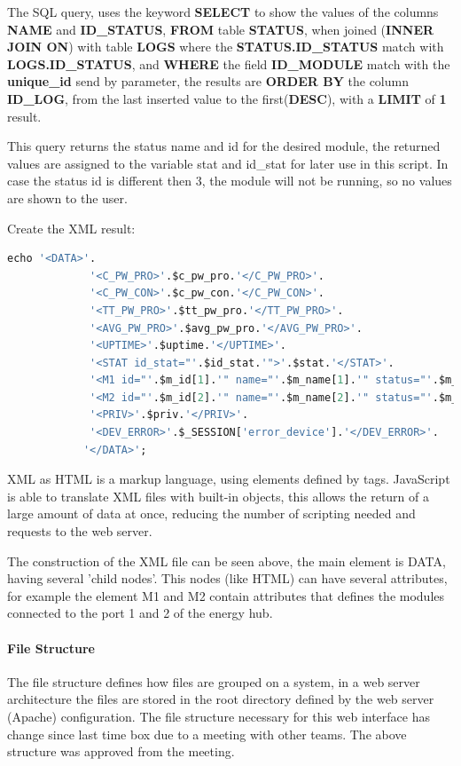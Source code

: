 The SQL query, uses the keyword \textbf{SELECT} to show the values of the columns \textbf{NAME} and \textbf{ID\_STATUS}, \textbf{FROM} table \textbf{STATUS}, when joined (\textbf{INNER JOIN ON}) with table \textbf{LOGS} where the \textbf{STATUS.ID\_STATUS} match with \textbf{LOGS.ID\_STATUS}, and \textbf{WHERE} the field \textbf{ID\_MODULE} match with the \textbf{unique\_id} send by parameter, the results are \textbf{ORDER BY} the column \textbf{ID\_LOG}, from the last inserted value to the first(\textbf{DESC}), with a \textbf{LIMIT} of \textbf{1} result.

This query returns the status name and id for the desired module, the returned values are assigned to the variable stat and id\_stat for later use in this script. In case the status id is different then 3, the module will not be running, so no values are shown to the user.

Create the XML result:
\begin{lstlisting}[language=sql]
	echo '<DATA>'.
			 '<C_PW_PRO>'.$c_pw_pro.'</C_PW_PRO>'.
			 '<C_PW_CON>'.$c_pw_con.'</C_PW_CON>'.
			 '<TT_PW_PRO>'.$tt_pw_pro.'</TT_PW_PRO>'.
			 '<AVG_PW_PRO>'.$avg_pw_pro.'</AVG_PW_PRO>'.
			 '<UPTIME>'.$uptime.'</UPTIME>'.
			 '<STAT id_stat="'.$id_stat.'">'.$stat.'</STAT>'.
			 '<M1 id="'.$m_id[1].'" name="'.$m_name[1].'" status="'.$m_status[1].'" id_status="'.$m_id_status[1].'"></M1>'.
			 '<M2 id="'.$m_id[2].'" name="'.$m_name[2].'" status="'.$m_status[2].'" id_status="'.$m_id_status[2].'"></M2>'.
			 '<PRIV>'.$priv.'</PRIV>'.
			 '<DEV_ERROR>'.$_SESSION['error_device'].'</DEV_ERROR>'.
			'</DATA>';
\end{lstlisting}
XML as HTML is a markup language, using elements defined by tags. JavaScript is able to translate XML files with built-in objects, this allows the return of a large amount of data at once, reducing the number of scripting needed and requests to the web server.

The construction of the XML file can be seen above, the main element is DATA, having several 'child nodes'. This nodes (like HTML) can have several attributes, for example the element M1 and M2 contain attributes that defines the modules connected to the port 1 and 2 of the energy hub.

\paragraph{File Structure}
The file structure defines how files are grouped on a system, in a web server architecture the files are stored in the root directory defined by the web server (Apache) configuration. The file structure necessary for this web interface has change since last time box due to a meeting with other teams. The above structure was approved from the meeting.

